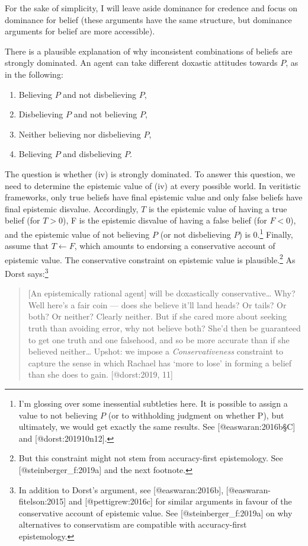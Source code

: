\documentclass[
]{article}
\begin{document}
For the sake of simplicity, I will leave aside dominance for credence
and focus on dominance for belief (these arguments have the same
structure, but dominance arguments for belief are more accessible).

There is a plausible explanation of why inconsistent combinations of
beliefs are strongly dominated. An agent can take different doxastic
attitudes towards \(P\), as in the following:

\begin{enumerate}
\def\labelenumi{(\roman{enumi})}
\item
  Believing \(P\) and not disbelieving \(P\),
\item
  Disbelieving \(P\) and not believing \(P\),
\item
  Neither believing nor disbelieving \(P\),
\item
  Believing \(P\) and disbelieving \(P\).
\end{enumerate}

The question is whether (iv) is strongly dominated. To answer this
question, we need to determine the epistemic value of (iv) at every
possible world. In veritistic frameworks, only true beliefs have final
epistemic value and only false beliefs have final epistemic disvalue.
Accordingly, \(T\) is the epistemic value of having a true belief (for
\(T > 0\)), F is the epistemic disvalue of having a false belief (for
\(F < 0\)), and the epistemic value of not believing \(P\) (or not
disbelieving \(P\)) is 0.\footnote{I'm glossing over some inessential
  subtleties here. It is possible to assign a value to not believing
  \(P\) (or to withholding judgment on whether P), but ultimately, we
  would get exactly the same results. See {[}@easwaran:2016b§C{]} and
  {[}@dorst:201910n12{]}.} Finally, assume that \(T \leftarrow F\),
which amounts to endorsing a conservative account of epistemic value.
The conservative constraint on epistemic value is plausible.\footnote{But
  this constraint might not stem from accuracy-first epistemology. See
  {[}@steinberger\_f:2019a{]} and the next footnote.} As Dorst
says:\footnote{In addition to Dorst's argument, see
  {[}@easwaran:2016b{]}, {[}@easwaran-fitelson:2015{]} and
  {[}@pettigrew:2016c{]} for similar arguments in favour of the
  conservative account of epistemic value. See
  {[}@steinberger\_f:2019a{]} on why alternatives to conservatism are
  compatible with accuracy-first epistemology.}

\begin{quote}
{[}An epistemically rational agent{]} will be doxastically
conservative\ldots{} Why? Well here's a fair coin --- does she believe
it'll land heads? Or tails? Or both? Or neither? Clearly neither. But if
she cared more about seeking truth than avoiding error, why not believe
both? She'd then be guaranteed to get one truth and one falsehood, and
so be more accurate than if she believed neither\ldots{} Upshot: we
impose a \emph{Conservativeness} constraint to capture the sense in
which Rachael has `more to lose' in forming a belief than she does to
gain. {[}@dorst:2019, 11{]}
\end{quote}
\end{document}
